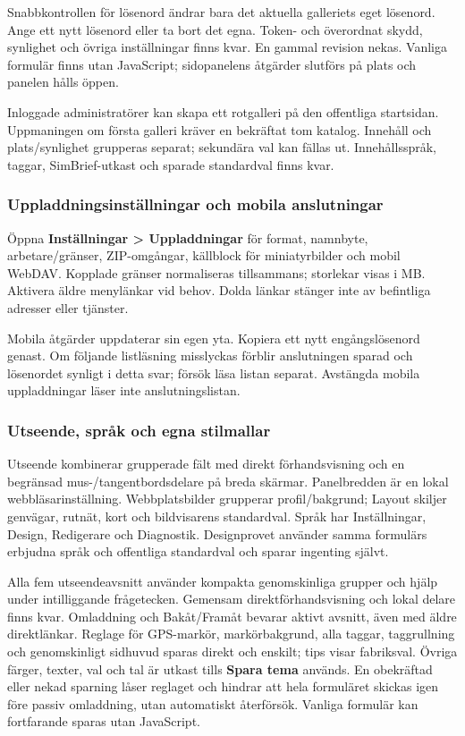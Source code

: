 \documentclass[11pt,a4paper]{article}
\newcommand{\ui}[1]{\textbf{#1}}
\begin{document}
Snabbkontrollen för lösenord ändrar bara det aktuella galleriets eget lösenord.
Ange ett nytt lösenord eller ta bort det egna. Token- och överordnat skydd,
synlighet och övriga inställningar finns kvar. En gammal revision nekas. Vanliga
formulär finns utan JavaScript; sidopanelens åtgärder slutförs på plats och
panelen hålls öppen.

Inloggade administratörer kan skapa ett rotgalleri på den offentliga startsidan.
Uppmaningen om första galleri kräver en bekräftat tom katalog. Innehåll och
plats/synlighet grupperas separat; sekundära val kan fällas ut. Innehållsspråk,
taggar, SimBrief-utkast och sparade standardval finns kvar.

\subsubsection{Uppladdningsinställningar och mobila anslutningar}
Öppna \ui{Inställningar > Uppladdningar} för format, namnbyte, arbetare/gränser,
ZIP-omgångar, källblock för miniatyrbilder och mobil WebDAV. Kopplade gränser
normaliseras tillsammans; storlekar visas i MB. Aktivera äldre menylänkar vid
behov. Dolda länkar stänger inte av befintliga adresser eller tjänster.

Mobila åtgärder uppdaterar sin egen yta. Kopiera ett nytt engångslösenord
genast. Om följande listläsning misslyckas förblir anslutningen sparad och
lösenordet synligt i detta svar; försök läsa listan separat. Avstängda mobila
uppladdningar läser inte anslutningslistan.

\subsubsection{Utseende, språk och egna stilmallar}
Utseende kombinerar grupperade fält med direkt förhandsvisning och en begränsad
mus-/tangentbordsdelare på breda skärmar. Panelbredden är en lokal
webbläsarinställning. Webbplatsbilder grupperar profil/bakgrund; Layout skiljer
genvägar, rutnät, kort och bildvisarens standardval. Språk har Inställningar,
Design, Redigerare och Diagnostik. Designprovet använder samma formulärs
erbjudna språk och offentliga standardval och sparar ingenting självt.

Alla fem utseendeavsnitt använder kompakta genomskinliga grupper och hjälp
under intilliggande frågetecken. Gemensam direktförhandsvisning och lokal delare
finns kvar. Omladdning och Bakåt/Framåt bevarar aktivt avsnitt, även med äldre
direktlänkar. Reglage för GPS-markör, markörbakgrund, alla taggar, taggrullning
och genomskinligt sidhuvud sparas direkt och enskilt; tips visar fabriksval.
Övriga färger, texter, val och tal är utkast tills \ui{Spara tema} används.
En obekräftad eller nekad sparning låser reglaget och hindrar att hela
formuläret
skickas igen före passiv omladdning, utan automatiskt återförsök. Vanliga
formulär kan fortfarande sparas utan JavaScript.
\end{document}
